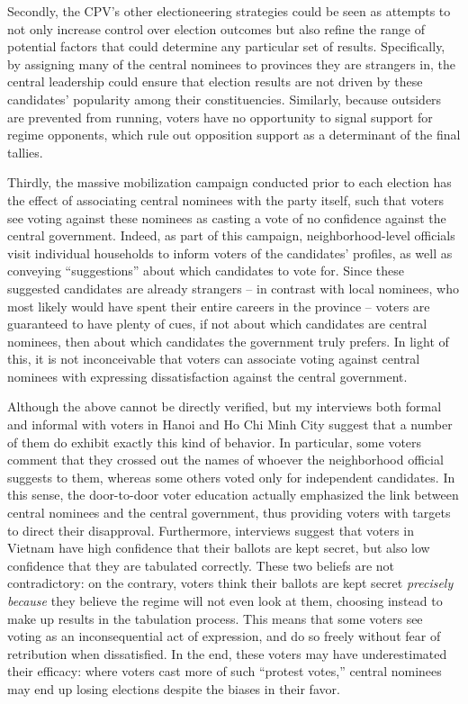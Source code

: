 \documentclass[12pt]{article}
\newcommand{\1}{\mathbbm{1}}
\begin{document}
Secondly, the CPV's other electioneering strategies could be seen as attempts to not only increase control over election outcomes but also refine the range of potential factors that could determine any particular set of results. Specifically, by assigning many of the central nominees to provinces they are strangers in, the central leadership could ensure that election results are not driven by these candidates' popularity among their constituencies. Similarly, because outsiders are prevented from running, voters have no opportunity to signal support for regime opponents, which rule out opposition support as a determinant of the final tallies. 

Thirdly, the massive mobilization campaign conducted prior to each election has the effect of associating central nominees with the party itself, such that voters see voting against these nominees as casting a vote of no confidence against the central government. Indeed, as part of this campaign, neighborhood-level officials visit individual households to inform voters of the candidates' profiles, as well as conveying ``suggestions'' about which candidates to vote for. Since these suggested candidates are already strangers -- in contrast with local nominees, who most likely would have spent their entire careers in the province -- voters are guaranteed to have plenty of cues, if not about which candidates are central nominees, then about which candidates the government truly prefers. In light of this, it is not inconceivable that voters can associate voting against central nominees with expressing dissatisfaction against the central government.

Although the above cannot be directly verified, but my interviews both formal and informal with voters in Hanoi and Ho Chi Minh City suggest that a number of them do exhibit exactly this kind of behavior. In particular, some voters comment that they crossed out the names of whoever the neighborhood official suggests to them, whereas some others voted only for independent candidates. In this sense, the door-to-door voter education actually emphasized the link between central nominees and the central government, thus providing voters with targets to direct their disapproval. Furthermore, interviews suggest that voters in Vietnam have high confidence that their ballots are kept secret, but also low confidence that they are tabulated correctly. These two beliefs are not contradictory: on the contrary, voters think their ballots are kept secret \textit{precisely because} they believe the regime will not even look at them, choosing instead to make up results in the tabulation process. This means that some voters see voting as an inconsequential act of expression, and do so freely without fear of retribution when dissatisfied. In the end, these voters may have underestimated their efficacy: where voters cast more of such ``protest votes,'' central nominees may end up losing elections despite the biases in their favor.
\end{document}
